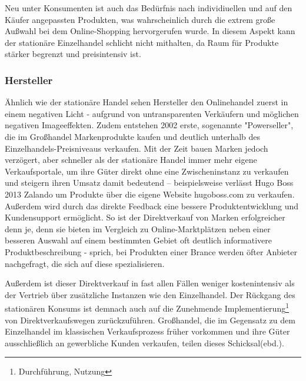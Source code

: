 \begin{folding}
Neu unter Konsumenten ist auch das Bedürfnis nach individiuellen und auf den Käufer angepassten Produkten\cite[S. 43]{Nitt}, was wahrscheinlich durch die extrem große Außwahl bei dem Online-Shopping hervorgerufen wurde. In diesem Aspekt kann der stationäre Einzelhandel schlicht nicht mithalten, da Raum für Produkte stärker begrenzt und preisintensiv ist.

\end{folding}

\begin{folding} \subsubsection{Hersteller}

Ähnlich wie der stationäre Handel sehen Hersteller den Onlinehandel zuerst in einem negativen Licht - aufgrund von untransparenten Verkäufern und möglichen negativen Imageeffekten\cite[S. 20]{Graf}. Zudem entstehen 2002 erste, sogenannte "Powerseller", die im Großhandel Markenprodukte kaufen und deutlich unterhalb des Einzelhandels-Preisniveaus verkaufen\cite[S. 26]{Graf}. Mit der Zeit bauen Marken jedoch verzögert, aber schneller als der stationäre Handel immer mehr eigene Verkaufsportale, um ihre Güter direkt ohne eine Zwischeninstanz zu verkaufen und steigern ihren Umsatz damit bedeutend – beispielsweise verlässt Hugo Boss 2013 Zalando um Produkte über die eigene Website hugoboss.com zu verkaufen\cite[S. 48f]{Graf}. Außerdem wird durch das direkte Feedback eine bessere Produktentwicklung und Kundensupport ermöglicht\cite[S. 39]{Graf}. So ist der Direktverkauf von Marken erfolgreicher denn je, denn sie bieten im Vergleich zu Online-Marktplätzen neben einer besseren Auswahl auf einem bestimmten Gebiet oft deutlich informativere Produktbeschreibung - sprich, bei Produkten einer Brance werden öfter Anbieter nachgefragt, die sich auf diese spezialisieren\cite[S. 18f]{evilcom}.

Außerdem ist dieser Direktverkauf in fast allen Fällen weniger kostenintensiv als der Vertrieb über zusätzliche Instanzen wie den Einzelhandel. Der Rückgang des stationären Konsums ist demnach auch auf die Zunehmende Implementierung\footnote{Durchführung, Nutzung} von Direktverkaufswegen zurückzuführen. Großhandel, die im Gegensatz zu dem Einzelhandel im klassischen Verkaufsprozess früher vorkommen und ihre Güter ausschließlich an gewerbliche Kunden verkaufen, teilen dieses Schicksal(ebd.).

\end{folding}

